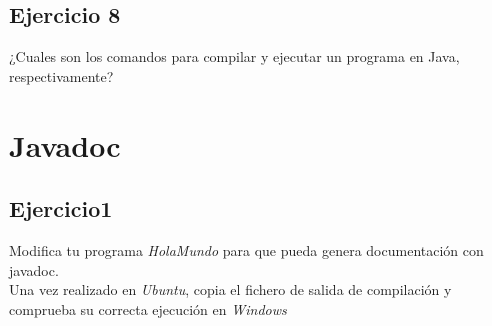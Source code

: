 \documentclass[4paper]{article}
\begin{document}
\subsection{Ejercicio 8}
¿Cuales son los comandos para compilar y ejecutar un programa en Java, respectivamente?

\section{Javadoc}
\subsection{Ejercicio1}
Modifica tu programa \emph{HolaMundo} para que pueda genera documentación con javadoc.\\
Una vez realizado en \emph{Ubuntu}, copia el fichero de salida de compilación y comprueba su correcta ejecución en \emph{Windows}
\newpage
\end{document}
